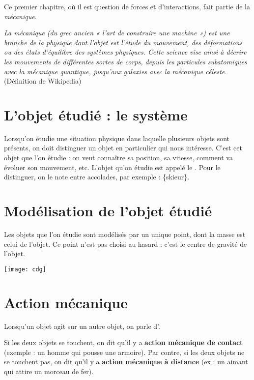 Ce premier chapitre, où il est question de forces et d'interactions, fait partie de la \emph{mécanique}. 

\textsl{La mécanique (du grec ancien « l'art de construire une machine ») est une branche de la physique dont l'objet est l'étude du mouvement, des déformations ou des états d'équilibre des systèmes physiques. Cette science vise ainsi à décrire les mouvements de différentes sortes de corps, depuis les particules subatomiques avec la mécanique quantique, jusqu'aux galaxies avec la mécanique céleste.}\hfill{\footnotesize(Définition de Wikipedia)}

\section{L'objet étudié : le système}

Lorsqu'on étudie une situation physique dans laquelle plusieurs objets sont présents, on doit distinguer un objet en particulier qui nous intéresse. C'est cet objet que l'on étudie : on veut connaître sa position, sa vitesse, comment va évoluer son mouvement, etc. L'objet qu'on étudie est appelé le \textbf{}. Pour le distinguer, on le note entre accolades, par exemple : \{skieur\}.


\section{Modélisation de l'objet étudié}

Les objets que l'on étudie sont modélisés par un unique point, dont la masse est celui de l'objet. Ce point n'est pas choisi au hasard : c'est le centre de gravité de l'objet.

\begin{center}
    \texttt{[image: cdg]}
\end{center}



\section{Action mécanique}

Lorsqu'un objet agit sur un autre objet, on parle d'\textbf{}.

Si les deux objets se touchent, on dit qu'il y a \textbf{action mécanique de contact} (exemple : un homme qui pousse une armoire). Par contre, si les deux objets ne se touchent pas, on dit qu'il y a \textbf{action mécanique à distance} (ex : un aimant qui attire un morceau de fer).   

